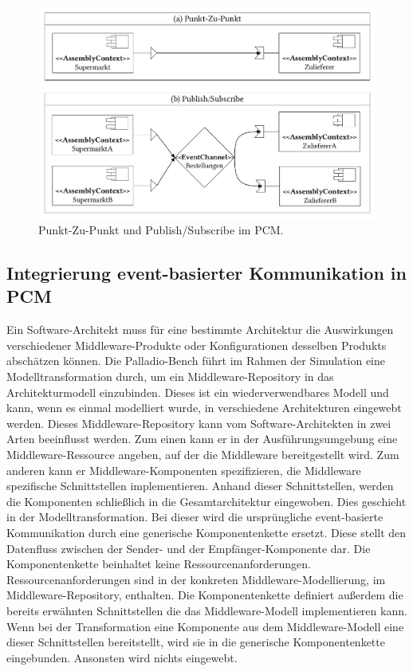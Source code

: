\begin{figure}
\center
  \includegraphics[width=1\textwidth]{images/grundlagen/grundlagenEventSystem.pdf}
  \caption{Punkt-Zu-Punkt und Publish/Subscribe im PCM.}
  \label{img:grundlageneventssystem}
\end{figure}



\subsection{Integrierung event-basierter Kommunikation in PCM}
\label{sec:eventbasetransformation}
Ein Software-Architekt muss für eine bestimmte Architektur die Auswirkungen verschiedener Middleware-Produkte oder Konfigurationen desselben Produkts abschätzen können. Die Palladio-Bench führt im Rahmen der Simulation eine Modelltransformation durch, um ein Middleware-Repository in das Architekturmodell einzubinden. Dieses ist ein wiederverwendbares Modell und kann, wenn es einmal modelliert wurde, in verschiedene Architekturen eingewebt werden. Dieses Middleware-Repository kann vom Software-Architekten in zwei Arten beeinflusst werden. Zum einen kann er in der Ausführungsumgebung eine Middleware-Ressource angeben, auf der die Middleware bereitgestellt wird. Zum anderen kann er Middleware-Komponen\-ten spezifizieren, die Middleware spezifische Schnittstellen implementieren. Anhand dieser Schnittstellen, werden die Komponenten schließlich in die Gesamtarchitektur eingewoben. Dies geschieht in der Modelltransformation. Bei dieser wird die ursprüngliche event-basierte Kommunikation durch eine generische Komponentenkette ersetzt. Diese stellt den Datenfluss zwischen der Sender- und der Empfänger-Komponente dar. Die Komponentenkette beinhaltet keine Ressourcenanforderungen. Ressourcenanforderungen sind in der konkreten Middleware-Modellierung, im Middleware-Repository, enthalten. Die Komponentenkette definiert außerdem die bereits erwähnten Schnittstellen die das Middleware-Modell implementieren kann. Wenn bei der Transformation eine Komponente aus dem Middleware-Modell eine dieser Schnittstellen bereitstellt, wird sie in die generische Komponentenkette eingebunden. Ansonsten wird nichts eingewebt.

